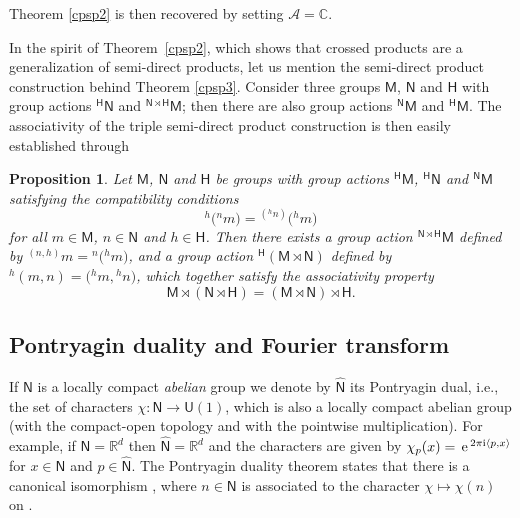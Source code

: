 \documentclass[pdftex]{sigma}
\numberwithin{equation}{section}
\def\ii{{{\rm i}}}
\newcommand{\sfH}{\mathsf{H}}
\newcommand{\sfN}{\mathsf{N}}
\newcommand{\sfM}{\mathsf{M}}
\newcommand{\sfU}{\mathsf{U}}
\newcommand{\complex}{{\mathbb C}} %
\newcommand{\real}{{\mathbb R}} %
\def\alg{{\mathcal A}}
\def\e{{\,\rm e}\,}
\newtheorem{Proposition}[Theorem]{Proposition}
 { \theoremstyle{definition}
\newtheorem{Definition}[Theorem]{Definition}
\newtheorem{Note}[Theorem]{Note}
\newtheorem{Example}[Theorem]{Example}
\newtheorem{Remark}[Theorem]{Remark} }
\begin{document}
Theorem \ref{cpsp2} is then recovered by setting $\alg=\complex$.

In the spirit of Theorem~\ref{cpsp2},
 which shows that crossed products are a generalization of
 semi-direct products, let us mention the semi-direct
 product construction behind Theorem \ref{cpsp3}. Consider three groups $\sfM $, $\sfN $ and $\sfH $ with group actions ${}^\sfH \sfN $ and
${}^{\sfN \rtimes \sfH }\sfM $; then there are also group actions
${}^\sfN \sfM $ and ${}^\sfH \sfM $. The associativity
of the triple semi-direct product construction is then easily established
through
\begin{Proposition}\label{MNH}
Let $\sfM $, $\sfN $ and $\sfH $ be groups with group actions ${}^\sfH \sfM $, ${}^\sfH \sfN $ and
${}^\sfN \sfM $ satisfying the compatibility conditions
\[
{}^h\big({}^nm\big) = {}^{({}^hn)}\big({}^hm\big)
\]
for all $m\in \sfM $, $n\in \sfN $ and $h\in \sfH $. Then there exists a group
action ${}^{\sfN \rtimes \sfH }\sfM $ defined by ${}^{(n,h)}m={}^n\big({}^hm\big)$, and a
group action ${}^\sfH (\sfM \rtimes \sfN )$ defined by ${}^h(m,n)=\big({}^hm,{}^hn\big)$,
which together satisfy the associativity property
\[
\sfM \rtimes(\sfN \rtimes \sfH ) = (\sfM \rtimes \sfN )\rtimes \sfH .
\]
\end{Proposition}

\subsection{Pontryagin duality and Fourier transform}

If $\sfN $ is a locally compact {\sl abelian} group we denote by $\widehat{\sfN }$
its Pontryagin dual, i.e., the set of characters $\chi\colon \sfN \to \sfU(1)$,
which is also a locally compact abelian group (with the compact-open
topology and with the pointwise multiplication). For example, if
$\sfN =\real^d$ then $\widehat{\sfN }=\real^d$ and the characters are given by
$\chi_p(x)=\e^{2\pi\ii \langle p, x\rangle}$ for $x\in \sfN $ and
$p\in\widehat{\sfN }$. The Pontryagin duality theorem states that there is a
canonical isomorphism \smash{$\widehat{\widehat{\sfN }}\simeq \sfN $}, where
$n\in\sfN$ is associated to the character $\chi\mapsto\chi(n)$ on
\smash{$\widehat\sfN$}.
\end{document}
